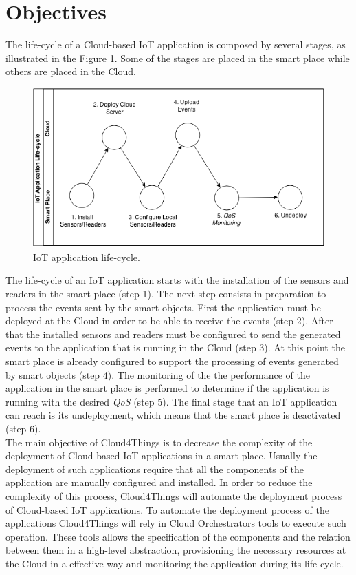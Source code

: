 \section{Objectives}
\label{sec:objectives}
The life-cycle of a Cloud-based IoT application is composed by several stages,
as illustrated in the Figure \ref{fig:life-cycle}. Some of the stages are placed in
the smart place while others are placed in the Cloud.
\begin{figure}[h!]
  \centering
  \includegraphics[width=\textwidth]{./images/life-cycle}
  \caption{IoT application life-cycle.}
  \label{fig:life-cycle}
\end{figure}

The life-cycle of an IoT application starts with the installation of the sensors and
readers in the smart place (step 1). The next step consists in preparation to
process the events sent by the smart objects. First the application must be deployed at
the Cloud in order to be able to receive the events (step 2). After that the installed
sensors and readers must be configured to send the generated events to the application that is
running in the Cloud (step 3). At this point the smart place is already configured to
support the processing of events generated by smart objects (step 4). The monitoring of the
the performance of the application in the smart place is performed to determine if the
application is running  with the desired \textit{QoS} (step 5). The final stage that an IoT
application can reach is its undeployment, which means that the smart place is deactivated (step 6).\\

The main objective of Cloud4Things is to decrease the complexity of the deployment of Cloud-based
IoT applications in a smart place. Usually the deployment of such applications require that
all the components of the application are manually configured and installed. In order
to reduce the complexity of this process, Cloud4Things will automate the deployment process
of Cloud-based IoT applications. To automate the deployment process of the applications
Cloud4Things will rely in Cloud Orchestrators tools to execute such operation. These
tools allows the specification of the components and the relation between them in a
high-level abstraction, provisioning the necessary resources at the Cloud in a effective
way and monitoring the application during its life-cycle.\\

